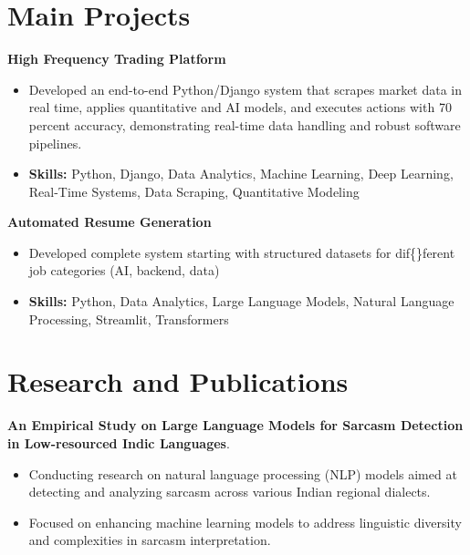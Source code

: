\documentclass[a4paper,11pt]{article}
\begin{document}
\section{\textbf{Main Projects}}

\vspace{1mm}
  \textbf{High Frequency Trading Platform  }
\vspace{-1.5mm} %
\begin{itemize}
  \item Developed an end-to-end Python/Django system that scrapes market data in real time, applies quantitative and AI models, and executes actions with 70 percent accuracy, demonstrating real-time data handling and robust software pipelines.
\vspace{-3mm}
  \item \textbf{Skills:} Python, Django, Data Analytics, Machine Learning, Deep Learning, Real-Time Systems, Data Scraping, Quantitative Modeling
\end{itemize}


\vspace{1mm}
   \textbf{Automated Resume Generation }
\vspace{-1.5mm} %
\begin{itemize}
  \item Developed complete system starting with structured datasets for dif\{\}ferent job categories (AI, backend, data)
\vspace{-3mm}
  \item \textbf{Skills:} Python, Data Analytics, Large Language Models, Natural Language Processing, Streamlit, Transformers
\end{itemize}



\section{\textbf{Research and Publications} \hfill }
\vspace{1mm}
  \textbf{An Empirical Study on Large Language Models for Sarcasm Detection in Low-resourced Indic Languages}.
\vspace{-1mm} %
\begin{itemize}
  \item Conducting research on natural language processing (NLP) models aimed at detecting and analyzing sarcasm across various Indian regional dialects.
\vspace{-3mm}
  \item Focused on enhancing machine learning models to address linguistic diversity and complexities in sarcasm interpretation.
\end{itemize}
\end{document}
